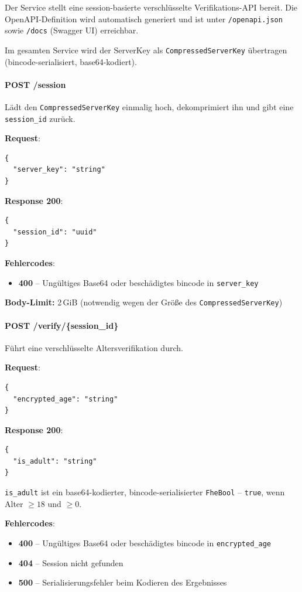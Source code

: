 Der Service stellt eine session-basierte verschlüsselte Verifikations-API bereit. Die OpenAPI-Definition wird automatisch generiert und ist unter \texttt{/openapi.json} sowie \texttt{/docs} (Swagger UI) erreichbar.

Im gesamten Service wird der ServerKey als \texttt{CompressedServerKey} übertragen (bincode-serialisiert, base64-kodiert).

\paragraph{POST /session}

Lädt den \texttt{CompressedServerKey} einmalig hoch, dekomprimiert ihn und gibt eine \texttt{session\_id} zurück.

\textbf{Request}:
\begin{lstlisting}
{
  "server_key": "string"
}
\end{lstlisting}

\textbf{Response 200}:
\begin{lstlisting}
{
  "session_id": "uuid"
}
\end{lstlisting}

\textbf{Fehlercodes}:
\begin{itemize}
  \item \textbf{400} -- Ungültiges Base64 oder beschädigtes bincode in \texttt{server\_key}
\end{itemize}

\textbf{Body-Limit:} 2\,GiB (notwendig wegen der Größe des \texttt{CompressedServerKey})

\paragraph{POST /verify/\{session\_id\}}

Führt eine verschlüsselte Altersverifikation durch.

\textbf{Request}:
\begin{lstlisting}
{
  "encrypted_age": "string"
}
\end{lstlisting}

\textbf{Response 200}:
\begin{lstlisting}
{
  "is_adult": "string"
}
\end{lstlisting}

\texttt{is\_adult} ist ein base64-kodierter, bincode-serialisierter \texttt{FheBool} -- \texttt{true}, wenn Alter $\geq 18$ und $\geq 0$.

\textbf{Fehlercodes}:
\begin{itemize}
  \item \textbf{400} -- Ungültiges Base64 oder beschädigtes bincode in \texttt{encrypted\_age}
  \item \textbf{404} -- Session nicht gefunden
  \item \textbf{500} -- Serialisierungsfehler beim Kodieren des Ergebnisses
\end{itemize}


